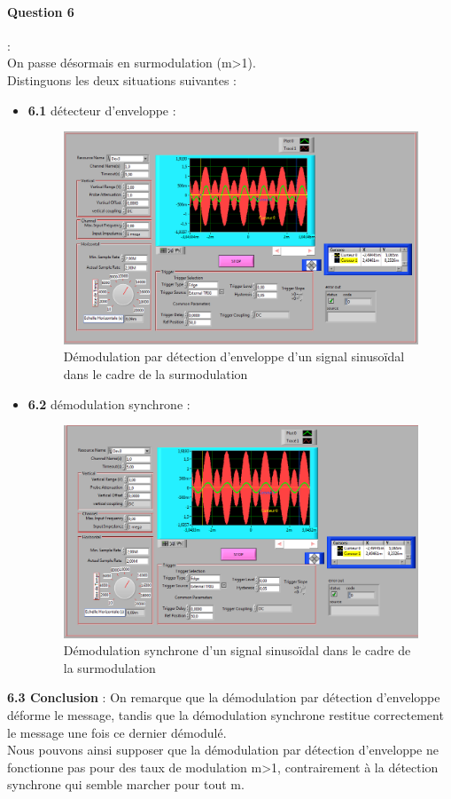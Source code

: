 \documentclass[french]{article}
\begin{document}
\paragraph{Question 6} : \\
On passe désormais en surmodulation (m>1). \\
Distinguons les deux situations suivantes : \\
\begin{itemize}
\item \textbf{6.1} détecteur d'enveloppe :  \\
\begin{figure}[!h]
\includegraphics[width=\textwidth]{enveloppe.png}
\caption{Démodulation par détection d'enveloppe d'un signal sinusoïdal dans le cadre de la surmodulation}
\end{figure}
\newpage
\item \textbf{6.2} démodulation synchrone : \\
\begin{figure}[!h]
\includegraphics[width=\textwidth]{synchrone.png}
\caption{Démodulation synchrone d'un signal sinusoïdal dans le cadre de la surmodulation}
\end{figure}

\end{itemize}
\textbf{
6.3 Conclusion }: On remarque que la démodulation par détection d'enveloppe déforme le message, tandis que la démodulation synchrone restitue correctement le message une fois ce dernier démodulé. \\ Nous pouvons ainsi supposer que la démodulation par détection d'enveloppe ne fonctionne pas pour des taux de modulation m>1, contrairement à la détection synchrone qui semble marcher pour tout m. 
\newpage
\end{document}
